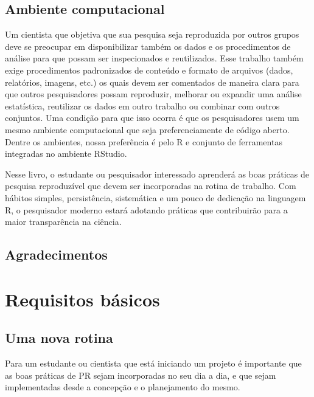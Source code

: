 \documentclass[]{book}
\begin{document}
\hypertarget{ambiente-computacional}{%
\section*{Ambiente computacional}\label{ambiente-computacional}}

Um cientista que objetiva que sua pesquisa seja reproduzida por outros
grupos deve se preocupar em disponibilizar também os dados e os
procedimentos de análise para que possam ser inspecionados e
reutilizados. Esse trabalho também exige procedimentos padronizados de
conteúdo e formato de arquivos (dados, relatórios, imagens, etc.) os
quais devem ser comentados de maneira clara para que outros
pesquisadores possam reproduzir, melhorar ou expandir uma análise
estatística, reutilizar os dados em outro trabalho ou combinar com
outros conjuntos. Uma condição para que isso ocorra é que os
pesquisadores usem um mesmo ambiente computacional que seja
preferenciamente de código aberto. Dentre os ambientes, nossa
preferência é pelo R e conjunto de ferramentas integradas no ambiente
RStudio.

Nesse livro, o estudante ou pesquisador interessado aprenderá as boas
práticas de pesquisa reproduzível que devem ser incorporadas na rotina
de trabalho. Com hábitos simples, persistência, sistemática e um pouco
de dedicação na linguagem R, o pesquisador moderno estará adotando
práticas que contribuirão para a maior transparência na ciência.

\hypertarget{agradecimentos}{%
\section*{Agradecimentos}\label{agradecimentos}}

\hypertarget{intro}{%
\chapter{Requisitos básicos}\label{intro}}

\hypertarget{uma-nova-rotina}{%
\section{Uma nova rotina}\label{uma-nova-rotina}}

Para um estudante ou cientista que está iniciando um projeto é
importante que as boas práticas de PR sejam incorporadas no seu dia a
dia, e que sejam implementadas desde a concepção e o planejamento do
mesmo.
\end{document}
